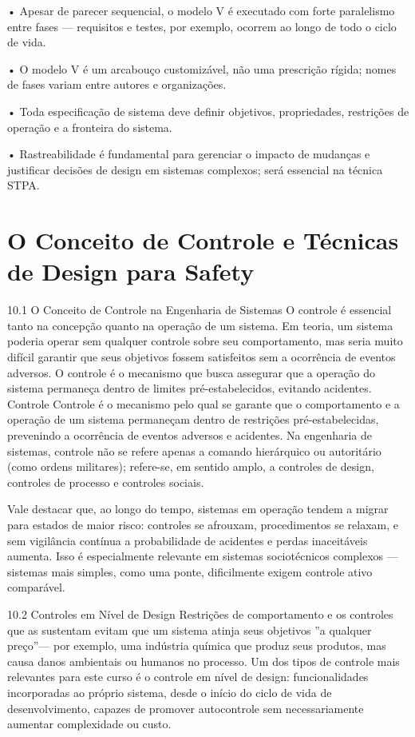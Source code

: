 • Apesar de parecer sequencial, o modelo V é executado com forte paralelismo entre fases — requisitos e testes, por exemplo, ocorrem ao longo de todo o ciclo de vida.

• O modelo V é um arcabouço customizável, não uma prescrição rígida; nomes de fases variam entre autores e organizações.

• Toda especificação de sistema deve definir objetivos, propriedades, restrições de operação e a fronteira do sistema.

• Rastreabilidade é fundamental para gerenciar o impacto de mudanças e justificar decisões de design em sistemas complexos; será essencial na técnica STPA.

\chapter{O Conceito de Controle e Técnicas de Design para Safety}

10.1 O Conceito de Controle na Engenharia de Sistemas O controle é essencial tanto na concepção quanto na operação de um sistema. Em teoria, um sistema poderia operar sem qualquer controle sobre seu comportamento, mas seria muito difícil garantir que seus objetivos fossem satisfeitos sem a ocorrência de eventos adversos. O controle é o mecanismo que busca assegurar que a operação do sistema permaneça dentro de limites pré-estabelecidos, evitando acidentes. Controle Controle é o mecanismo pelo qual se garante que o comportamento e a operação de um sistema permaneçam dentro de restrições pré-estabelecidas, prevenindo a ocorrência de eventos adversos e acidentes. Na engenharia de sistemas, controle não se refere apenas a comando hierárquico ou autoritário (como ordens militares); refere-se, em sentido amplo, a controles de design, controles de processo e controles sociais.

Vale destacar que, ao longo do tempo, sistemas em operação tendem a migrar para estados de maior risco: controles se afrouxam, procedimentos se relaxam, e sem vigilância contínua a probabilidade de acidentes e perdas inaceitáveis aumenta. Isso é especialmente relevante em sistemas sociotécnicos complexos — sistemas mais simples, como uma ponte, dificilmente exigem controle ativo comparável.

10.2 Controles em Nível de Design Restrições de comportamento e os controles que as sustentam evitam que um sistema atinja seus objetivos ”a qualquer preço”— por exemplo, uma indústria química que produz seus produtos, mas causa danos ambientais ou humanos no processo. Um dos tipos de controle mais relevantes para este curso é o controle em nível de design: funcionalidades incorporadas ao próprio sistema, desde o início do ciclo de vida de desenvolvimento, capazes de promover autocontrole sem necessariamente aumentar complexidade ou custo.

